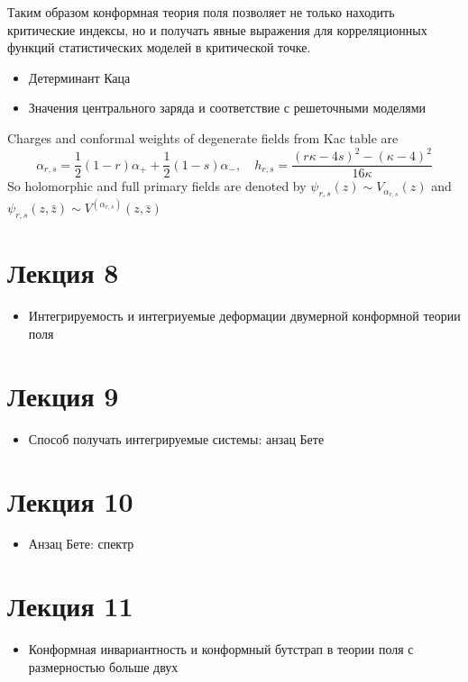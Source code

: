 \documentclass[a4paper,12pt]{article}
\theoremstyle{definition}
\theoremstyle{definition}
\theoremstyle{definition}
\begin{document}
Таким образом конформная теория поля позволяет не только находить критические индексы, но и получать явные выражения для корреляционных функций статистических моделей в критической точке. 



  \begin{itemize}
  \item Детерминант Каца
  \item Значения центрального заряда и соответствие с решеточными моделями
  \end{itemize}

Charges and conformal weights of degenerate fields from Kac table are
\begin{equation}
  \label{eq:139}
  \alpha_{r,s}=\frac{1}{2}(1-r)\alpha_{+}+\frac{1}{2}(1-s)\alpha_{-},\quad h_{r,s}=\frac{(r\kappa-4s)^{2}-(\kappa-4)^{2}}{16\kappa}
\end{equation}
So holomorphic and full primary fields are denoted by $\psi_{r,s}(z)\sim V_{\alpha_{r,s}}(z)$ and
$\psi_{r,s}(z,\bar z)\sim V^{(\alpha_{r,s})}(z,\bar z)$

\section{Лекция 8}
\label{sec:-8}

  \begin{itemize}
  \item Интегрируемость и интегриуемые деформации двумерной конформной теории поля
  \end{itemize}

\section{Лекция 9}
  \begin{itemize}
  \item Способ получать интегрируемые системы: анзац Бете
  \end{itemize}
\section{Лекция 10}
  \begin{itemize}
  \item Анзац Бете: спектр
  \end{itemize}

\section{Лекция 11}
  \begin{itemize}
  \item  Конформная инвариантность и конформный бутстрап в теории поля с размерностью больше двух
  \end{itemize}
\end{document}
